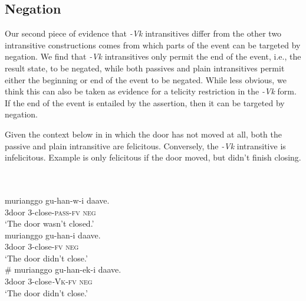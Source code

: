 \documentclass[output=paper]{langsci/langscibook}
\begin{document}
\subsection{Negation} 

Our second piece of evidence that \textit{-Vk }intransitives differ from the other two intransitive constructions comes from which parts of the event can be targeted by negation. We find that \textit{-Vk }intransitives only permit the end of the event, i.e., the result state, to be negated, while both passives and plain intransitives permit either the beginning or end of the event to be negated. While less obvious, we think this can also be taken as evidence for a telicity restriction in the \textit{-Vk} form. If the end of the event is entailed by the assertion, then it can be targeted by negation. 

Given the context below in  in which the door has not moved at all, both the passive  and plain intransitive  are felicitous. Conversely, the \textit{-Vk} intransitive  is infelicitous. Example  is only felicitous if the door moved, but didn’t finish closing.

\ea\label{exx:}
{}\\
\ea\label{ex:}
\\
\gll   murianggo gu-han-w-i           daave.\\
       3door        3-close-\textsc{pass}-\textsc{fv}    \textsc{neg}\\
\glt ‘The door wasn’t closed.’
\ex
{}\\
\gll \textbf{  }murianggo gu-han-i     daave.\\
     \textit{  }3door         3-close-\textsc{fv}  \textsc{neg}\\
\glt ‘The door didn’t close.’
\ex
{}\\
\gll \textbf{  }\# murianggo gu-han-ek-i      daave.\\
     \textit{     }3door         3-close\textit{-}\textsc{Vk}-\textsc{fv}   \textsc{neg}\\
\glt ‘The door didn’t close.’
\z
\z
\end{document}
